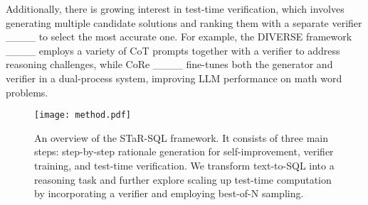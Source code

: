 Additionally, there is growing interest in test-time verification, which involves generating multiple candidate solutions and ranking them with a separate verifier ____ to select the most accurate one. For example, the DIVERSE framework ____ employs a variety of CoT prompts together with a verifier to address reasoning challenges, while CoRe ____ fine-tunes both the generator and verifier in a dual-process system, improving LLM performance on math word problems.

\begin{figure*}[ht]
 \centering
 \texttt{[image: method.pdf]}
 \caption{An overview of the STaR-SQL framework. It consists of three main steps: step-by-step rationale generation for self-improvement, verifier training, and test-time verification. We transform text-to-SQL into a reasoning task and further explore scaling up test-time computation by incorporating a verifier and employing best-of-N sampling.}
\end{figure*}
